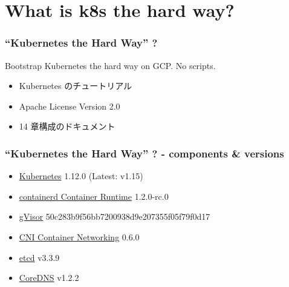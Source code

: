 \documentclass[aspectratio=169,11pt,hyperref={colorlinks=true}]{beamer}
\begin{document}
\section{What is k8s the hard way?}
\begin{frame}
  \frametitle{``Kubernetes the Hard Way'' ?}
  Bootstrap Kubernetes the hard way on GCP. No scripts.
  \begin{itemize}
    \item Kubernetes のチュートリアル
    \item Apache License Version 2.0
    \item 14 章構成のドキュメント
  \end{itemize}
\end{frame}

\begin{frame}
  \frametitle{``Kubernetes the Hard Way'' ? - components \& versions}
  \begin{itemize}
    \item \href{https://github.com/kubernetes/kubernetes}{Kubernetes} 1.12.0 (Latest: v1.15)
    \item \href{https://github.com/containerd/containerd}{containerd Container Runtime} 1.2.0-rc.0
    \item \href{https://github.com/google/gvisor}{gVisor} 50c283b9f56bb7200938d9e207355f05f79f0d17
    \item \href{https://github.com/containernetworking/cni}{CNI Container Networking} 0.6.0
    \item \href{https://github.com/etcd-io/etcd}{etcd} v3.3.9
    \item \href{https://github.com/coredns/coredns}{CoreDNS} v1.2.2

  \end{itemize}
\end{frame}
\end{document}
